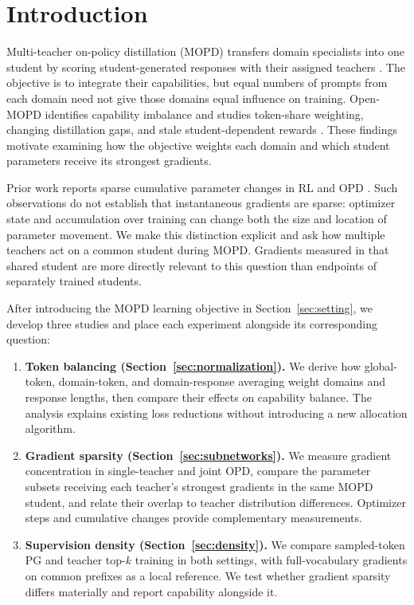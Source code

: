 \section{Introduction}
\label{sec:intro}

Multi-teacher on-policy distillation (MOPD) transfers domain specialists
into one student by scoring student-generated responses with their
assigned teachers \citep{ma2026mopdmultiteacheronpolicydistillation}.
The objective is to integrate their capabilities, but equal numbers
of prompts from each domain need not give those domains equal influence
on training. Open-MOPD identifies capability imbalance and studies
token-share weighting, changing distillation gaps, and stale
student-dependent rewards \citep{gao2026openmopddiagnosingfixingcapability}.
These findings motivate examining how the objective weights each
domain and which student parameters receive its strongest gradients.

Prior work reports sparse cumulative parameter changes in RL
\citep{mukherjee2025subnetworks} and OPD
\citep{yu2026denseupdates,shen2026opdgeometry}.
Such observations do not establish that instantaneous gradients are
sparse: optimizer state and accumulation over training can change
both the size and location of parameter movement. We make this
distinction explicit and ask how multiple teachers act on a common
student during MOPD. Gradients measured in that shared student are
more directly relevant to this question than endpoints of separately
trained students.

After introducing the MOPD learning objective in
Section~\ref{sec:setting}, we develop three studies and place each
experiment alongside its corresponding question:
\begin{enumerate}
\item \textbf{Token balancing (Section~\ref{sec:normalization}).}
We derive how global-token, domain-token, and domain-response averaging
weight domains and response lengths, then compare their effects on
capability balance. The analysis explains existing loss reductions
without introducing a new allocation algorithm.
\item \textbf{Gradient sparsity (Section~\ref{sec:subnetworks}).}
We measure gradient concentration in single-teacher and joint OPD,
compare the parameter subsets receiving each teacher's strongest
gradients in the same MOPD student, and relate their overlap to
teacher distribution differences. Optimizer steps and cumulative
changes provide complementary measurements.
\item \textbf{Supervision density (Section~\ref{sec:density}).}
We compare sampled-token PG and teacher top-$k$ training in both
settings, with full-vocabulary gradients on common prefixes as a
local reference. We test whether gradient sparsity differs materially
and report capability alongside it.
\end{enumerate}

